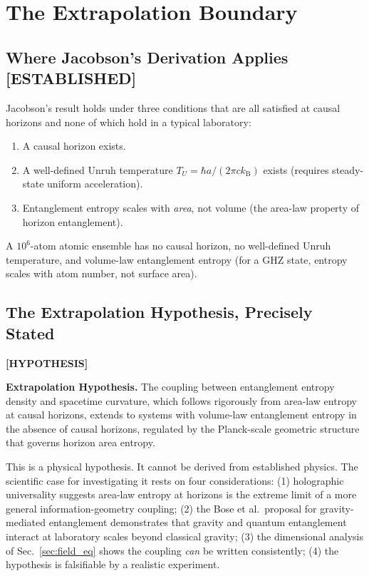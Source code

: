 \documentclass[12pt,letterpaper]{article}
\theoremstyle{plain}
\theoremstyle{definition}
\theoremstyle{remark}
\newcommand{\kB}{k_{\mathrm{B}}}
\begin{document}
\section{The Extrapolation Boundary}
\label{sec:extrapolation}

\subsection{Where Jacobson's Derivation Applies \textcolor{blue!70!black}{[ESTABLISHED]}}

Jacobson's result holds under three conditions that are all satisfied at
causal horizons and none of which hold in a typical laboratory:
\begin{enumerate}
  \item A causal horizon exists.
  \item A well-defined Unruh temperature $T_U = \hbar a / (2\pi c\kB)$
    exists (requires steady-state uniform acceleration).
  \item Entanglement entropy scales with \emph{area}, not volume
    (the area-law property of horizon entanglement).
\end{enumerate}
A $10^6$-atom atomic ensemble has no causal horizon, no well-defined
Unruh temperature, and volume-law entanglement entropy (for a GHZ state,
entropy scales with atom number, not surface area).

\subsection{The Extrapolation Hypothesis, Precisely Stated}
\label{subsec:extrap}
\textcolor{orange!80!black}{\textbf{[HYPOTHESIS]}}

\begin{corestatement}
\textbf{Extrapolation Hypothesis.} The coupling between entanglement
entropy density and spacetime curvature, which follows rigorously from
area-law entropy at causal horizons, extends to systems with volume-law
entanglement entropy in the absence of causal horizons, regulated by
the Planck-scale geometric structure that governs horizon area entropy.
\end{corestatement}

This is a physical hypothesis. It cannot be derived from established
physics. The scientific case for investigating it rests on four
considerations: (1) holographic universality suggests area-law entropy at
horizons is the extreme limit of a more general information-geometry
coupling; (2) the Bose et al.\ proposal for gravity-mediated entanglement
\cite{bose2017} demonstrates that gravity and quantum entanglement
interact at laboratory scales beyond classical gravity; (3) the
dimensional analysis of Sec.~\ref{sec:field_eq} shows the coupling
\emph{can} be written consistently; (4) the hypothesis is falsifiable by
a realistic experiment.
\end{document}
